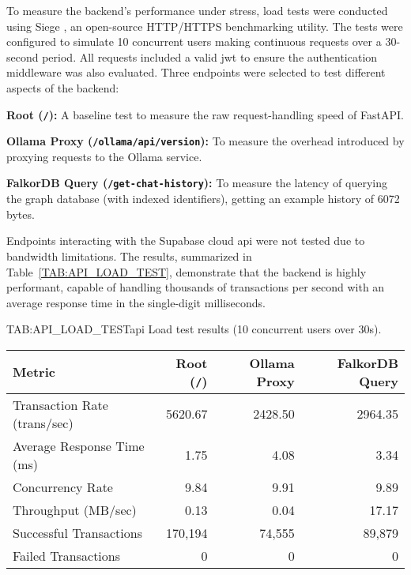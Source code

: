 To measure the backend's performance under stress, load tests were conducted using Siege \cite{SIEGE}, an open-source HTTP/HTTPS benchmarking utility. The tests were configured to simulate 10 concurrent users making continuous requests over a 30-second period. All requests included a valid \acs{jwt} to ensure the authentication middleware was also evaluated. Three endpoints were selected to test different aspects of the backend:

\begin{compactitem}[\textbullet]
    \item \textbf{Root (\texttt{/}):} A baseline test to measure the raw request-handling speed of FastAPI.
    \item \textbf{Ollama Proxy (\texttt{/ollama/api/version}):} To measure the overhead introduced by proxying requests to the Ollama service.
    \item \textbf{FalkorDB Query (\texttt{/get-chat-history}):} To measure the latency of querying the graph database (with indexed identifiers), getting an example history of 6072 bytes.
\end{compactitem}

Endpoints interacting with the Supabase cloud \acs{api} were not tested due to bandwidth limitations. The results, summarized in Table~\ref{TAB:API_LOAD_TEST}, demonstrate that the backend is highly performant, capable of handling thousands of transactions per second with an average response time in the single-digit milliseconds.

\begin{table}[Load Test Results]{TAB:API_LOAD_TEST}{\acs{api} Load test results (10 concurrent users over 30s).}
    \begin{tabular}{l r r r}
        \hline
        \textbf{Metric} & \textbf{Root (\texttt{/})} & \textbf{Ollama Proxy} & \textbf{FalkorDB Query} \\
        \hline
        Transaction Rate (trans/sec) & 5620.67 & 2428.50 & 2964.35 \\
        Average Response Time (ms) & 1.75 & 4.08 & 3.34 \\
        Concurrency Rate & 9.84 & 9.91 & 9.89 \\
        Throughput (MB/sec) & 0.13 & 0.04 & 17.17 \\
        Successful Transactions & 170,194 & 74,555 & 89,879 \\
        Failed Transactions & 0 & 0 & 0 \\
        \hline
    \end{tabular}
\end{table}